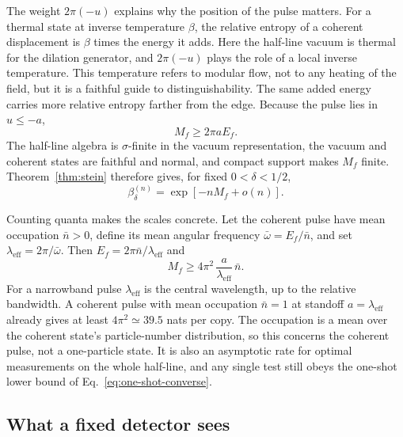 \documentclass[11pt,a4paper]{article}
\begin{document}
The weight $2\pi(-u)$ explains why the position of the pulse matters. For a thermal state at inverse temperature $\beta$, the relative entropy of a coherent displacement is $\beta$ times the energy it adds. Here the half-line vacuum is thermal for the dilation generator, and $2\pi(-u)$ plays the role of a local inverse temperature. This temperature refers to modular flow, not to any heating of the field, but it is a faithful guide to distinguishability. The same added energy carries more relative entropy farther from the edge. Because the pulse lies in $u\le-a$,
\begin{equation}
M_f\ge2\pi aE_f.
\label{eq:standoff}
\end{equation}
The half-line algebra is $\sigma$-finite in the vacuum representation, the vacuum and coherent states are faithful and normal, and compact support makes $M_f$ finite. Theorem~\ref{thm:stein} therefore gives, for fixed $0<\delta<1/2$,
\begin{equation}
\beta_\delta^{(n)}
=\exp[-nM_f+o(n)].
\label{eq:explicit-rate}
\end{equation}

Counting quanta makes the scales concrete. Let the coherent pulse have mean occupation $\bar n>0$, define its mean angular frequency $\bar\omega=E_f/\bar n$, and set $\lambda_{\mathrm{eff}}=2\pi/\bar\omega$. Then $E_f=2\pi\bar n/\lambda_{\mathrm{eff}}$ and
\begin{equation}
M_f\ge
4\pi^2\,\frac{a}{\lambda_{\mathrm{eff}}}\,\bar n.
\label{eq:geometry-energy}
\end{equation}
For a narrowband pulse $\lambda_{\mathrm{eff}}$ is the central wavelength, up to the relative bandwidth. A coherent pulse with mean occupation $\bar n=1$ at standoff $a=\lambda_{\mathrm{eff}}$ already gives at least $4\pi^2\simeq39.5$ nats per copy. The occupation is a mean over the coherent state's particle-number distribution, so this concerns the coherent pulse, not a one-particle state. It is also an asymptotic rate for optimal measurements on the whole half-line, and any single test still obeys the one-shot lower bound of Eq.~\eqref{eq:one-shot-converse}.

\subsection{What a fixed detector sees}
\end{document}
